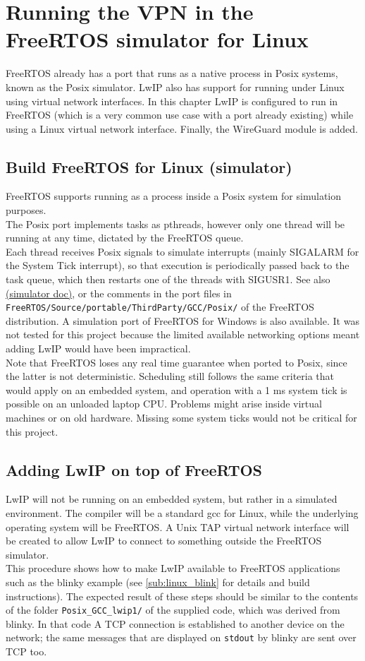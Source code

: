 \chapter{Running the VPN in the FreeRTOS simulator for Linux}
FreeRTOS already has a port that runs as a native process in Posix systems, known as the Posix simulator. LwIP also has support for running under Linux using virtual network interfaces. In this chapter LwIP is configured to run in FreeRTOS (which is a very common use case with a port already existing) while using a Linux virtual network interface. Finally, the WireGuard module is added.

\section{Build FreeRTOS for Linux (simulator)}
FreeRTOS supports running as a process inside a Posix system for simulation purposes.\\
The Posix port implements tasks as pthreads, however only one thread will be running at any time, dictated by the FreeRTOS queue.\\
Each thread receives Posix signals to simulate interrupts (mainly SIGALARM for the System Tick interrupt), so that execution is periodically passed back to the task queue, which then restarts one of the threads with SIGUSR1.
See also \href{https://www.freertos.org/FreeRTOS-simulator-for-Linux.html}{(simulator doc)}, or the comments in the port files in \texttt{FreeRTOS/Source/portable/ThirdParty/GCC/Posix/} of the FreeRTOS distribution.
A simulation port of FreeRTOS for Windows is also available. It was not tested for this project because the limited available networking options meant adding LwIP would have been impractical.
\\Note that FreeRTOS loses any real time guarantee when ported to Posix, since the latter is not deterministic.
Scheduling still follows the same criteria that would apply on an embedded system, and operation with a 1 ms system tick is possible on an unloaded laptop CPU. Problems might arise inside virtual machines or on old hardware. Missing some system ticks would not be critical for this project.


\section{Adding LwIP on top of FreeRTOS}
LwIP will not be running on an embedded system, but rather in a simulated environment. The compiler will be a standard gcc for Linux, while the underlying operating system will be FreeRTOS. A Unix TAP virtual network interface will be created to allow LwIP to connect to something outside the FreeRTOS simulator.
\\This procedure shows how to make LwIP available to FreeRTOS applications such as the blinky example (see \ref{sub:linux_blink} for details and build instructions).
The expected result of these steps should be similar to the contents of the folder \texttt{Posix\_GCC\_lwip1/} of the supplied code, which was derived from blinky. In that code A TCP connection is established to another device on the network; the same messages that are displayed on \texttt{stdout} by blinky are sent over TCP too.

